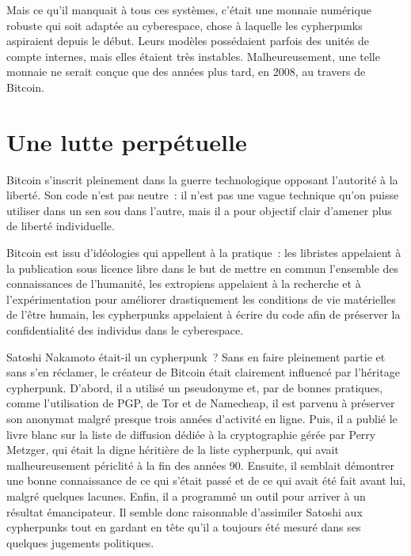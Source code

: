 Mais ce qu'il manquait à tous ces systèmes, c'était une monnaie numérique robuste qui soit adaptée au cyberespace, chose à laquelle les cypherpunks aspiraient depuis le début. Leurs modèles possédaient parfois des unités de compte internes, mais elles étaient très instables. Malheureusement, une telle monnaie ne serait conçue que des années plus tard, en 2008, au travers de Bitcoin.


\section*{Une lutte perpétuelle}

Bitcoin s'inscrit pleinement dans la guerre technologique opposant l'autorité à la liberté. Son code n'est pas neutre~: il n'est pas une vague technique qu'on puisse utiliser dans un sen sou dans l'autre, mais il a pour objectif clair d'amener plus de liberté individuelle.

Bitcoin est issu d'idéologies qui appellent à la pratique~: les libristes appelaient à la publication sous licence libre dans le but de mettre en commun l'ensemble des connaissances de l'humanité, les extropiens appelaient à la recherche et à l'expérimentation pour améliorer drastiquement les conditions de vie matérielles de l'être humain, les cypherpunks appelaient à écrire du code afin de préserver la confidentialité des individus dans le cyberespace.

Satoshi Nakamoto était-il un cypherpunk~? Sans en faire pleinement partie et sans s'en réclamer, le créateur de Bitcoin était clairement influencé par l'héritage cypherpunk. D'abord, il a utilisé un pseudonyme et, par de bonnes pratiques, comme l'utilisation de PGP, de Tor et de Namecheap, il est parvenu à préserver son anonymat malgré presque trois années d'activité en ligne. Puis, il a publié le livre blanc sur la liste de diffusion dédiée à la cryptographie gérée par Perry Metzger, qui était la digne héritière de la liste cypherpunk, qui avait malheureusement périclité à la fin des années 90. Ensuite, il semblait démontrer une bonne connaissance de ce qui s'était passé et de ce qui avait été fait avant lui, malgré quelques lacunes. Enfin, il a programmé un outil pour arriver à un résultat émancipateur. Il semble donc raisonnable d'assimiler Satoshi aux cypherpunks tout en gardant en tête qu'il a toujours été mesuré dans ses quelques jugements politiques.


\printendnotes